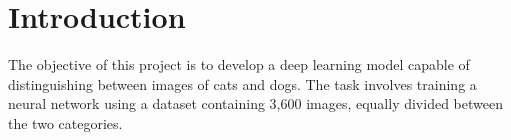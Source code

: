 \section{Introduction}
The objective of this project is to develop a deep learning model capable of distinguishing between images of cats and dogs.
The task involves training a neural network using a dataset containing 3,600 images, equally divided between the two categories.

